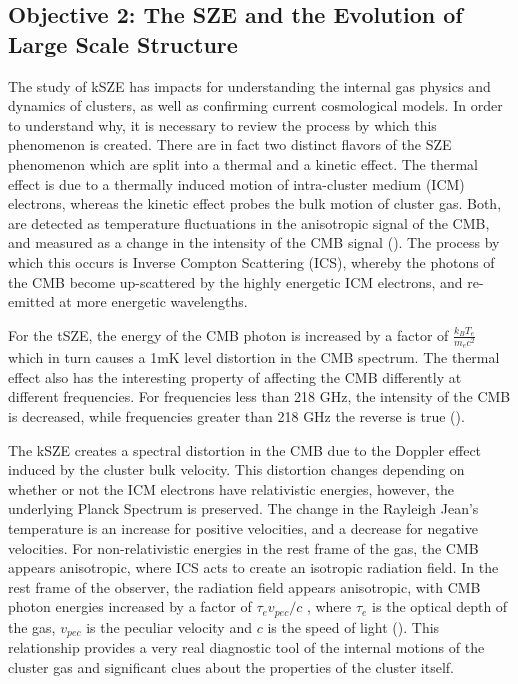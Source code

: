 \documentclass[manuscript]{aastex}
\begin{document}
\subsection{\textbf{Objective 2: The SZE and the Evolution of Large Scale Structure}}

The study of kSZE has impacts for understanding the internal gas physics and dynamics of clusters, as well as confirming current cosmological models. In order to understand why, it is necessary to review the process by which this phenomenon is created. There are in fact two distinct flavors of the SZE phenomenon which are split into a thermal and a kinetic effect. The thermal effect is due to a thermally induced motion of intra-cluster medium (ICM) electrons, whereas the kinetic effect probes the bulk motion of cluster gas. Both, are detected as temperature fluctuations in the anisotropic signal of the CMB, and measured as a change in the intensity of the CMB signal (\cite{Sunyaev1970}).  The process by which this occurs is Inverse Compton Scattering (ICS), whereby the photons of the CMB become up-scattered by the highly energetic ICM electrons, and re-emitted at more energetic wavelengths. 

For the tSZE, the energy of the CMB photon is increased by a factor of \(\frac{k_{B}T_{e}}{m_{e}c^{2}}\) which in turn causes a 1mK level distortion in the CMB spectrum. The thermal effect also has the interesting property of affecting the CMB differently at different frequencies. For frequencies less than 218 GHz, the intensity of the CMB is decreased, while frequencies greater than 218 GHz the reverse is true (\cite{Carlstrom2002}). 

The kSZE creates a spectral distortion in the CMB due to the Doppler effect induced by the cluster bulk velocity.  This distortion changes depending on whether or not the ICM electrons have relativistic energies, however, the underlying Planck Spectrum is preserved. The change in the Rayleigh Jean's temperature is an increase for positive velocities, and a decrease for negative velocities. For non-relativistic energies in the rest frame of the gas, the CMB appears anisotropic, where ICS acts to create an isotropic radiation field. In the rest frame of the observer, the radiation field appears anisotropic, with CMB photon energies increased by a factor of \(\tau_{e} v_{pec} / c\) , where \(\tau_{e}\) is the optical depth of the gas, \(v_{pec}\) is the peculiar velocity and \(c\) is the speed of light (\cite{Birkinshaw1999}). This relationship provides a very real diagnostic tool of the internal motions of the cluster gas and significant clues about the properties of the cluster itself.
\end{document}

